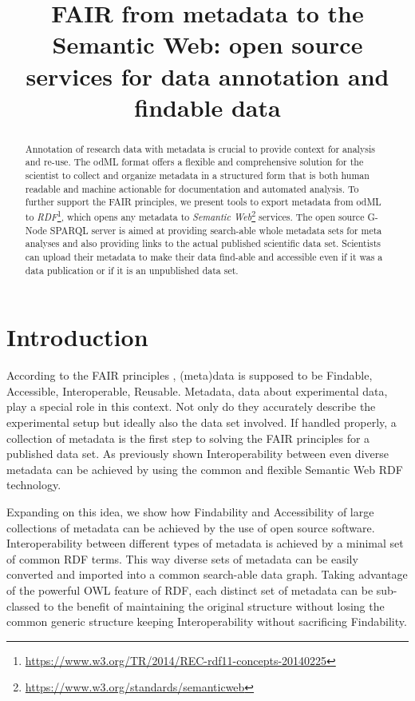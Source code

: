 \documentclass{article}
\title{FAIR from metadata to the Semantic Web: open source services for data annotation and findable data}
\begin{document}
\maketitle

\begin{abstract}
Annotation of research data with metadata is crucial to provide context for analysis and  re-use. The odML format offers a flexible and comprehensive solution for the scientist to collect and organize metadata in a structured form that is both human readable and machine actionable for documentation and automated analysis. To further support the FAIR principles, we present tools to export metadata from odML to \textit{RDF}\footnote{\url{https://www.w3.org/TR/2014/REC-rdf11-concepts-20140225}}, which opens any metadata to \textit{Semantic Web}\footnote{\url{https://www.w3.org/standards/semanticweb}} services. The open source G-Node SPARQL server is aimed at providing search-able whole metadata sets for meta analyses and also providing links to the actual published scientific data set. Scientists can upload their metadata to make their data find-able and accessible even if it was a data publication or if it is an unpublished data set.
\end{abstract}

\section{Introduction} \label{sec:introduction}
According to the FAIR principles \cite{Wilkinson_2016}, (meta)data is supposed to be Findable, Accessible, Interoperable, Reusable. Metadata, data about experimental data, play a special role in this context. Not only do they accurately describe the experimental setup but ideally also the data set involved. If handled properly, a collection of metadata is the first step to solving the FAIR principles for a published data set. As previously shown \cite{Teeters_2017} Interoperability between even diverse metadata can be achieved by using the common and flexible Semantic Web RDF technology.

Expanding on this idea, we show how Findability and Accessibility of large collections of metadata can be achieved by the use of open source software. Interoperability between different types of metadata is achieved by a minimal set of common RDF terms. This way diverse sets of metadata can be easily converted and imported into a common search-able data graph. Taking advantage of the powerful OWL feature of RDF, each distinct set of metadata can be sub-classed to the benefit of maintaining the original structure without losing the common generic structure keeping Interoperability without sacrificing Findability.
\end{document}

